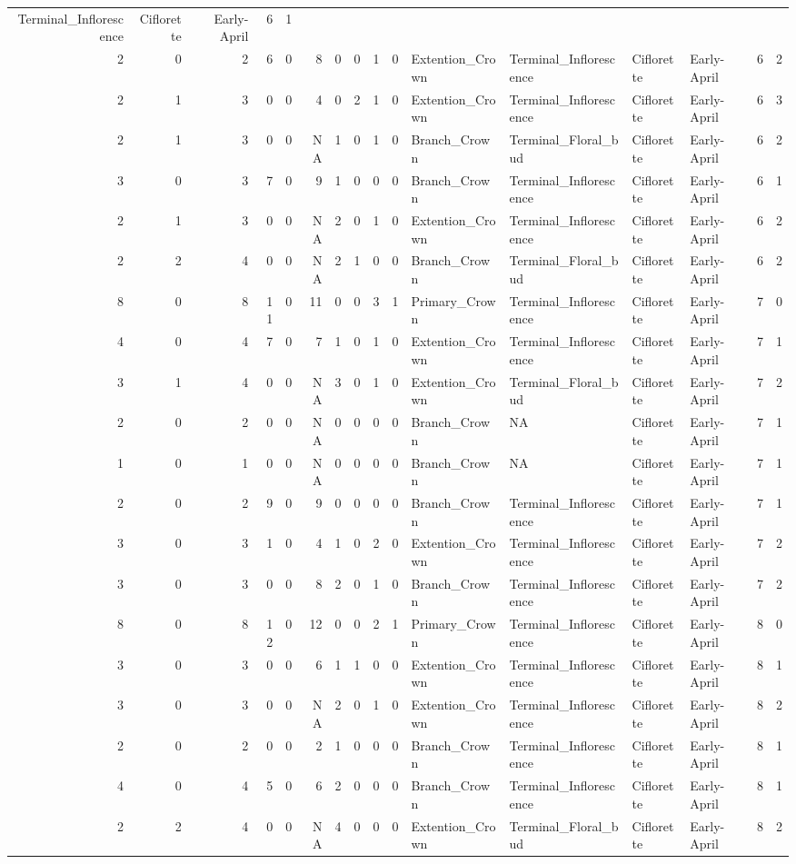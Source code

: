 \documentclass[]{article}
\begin{document}
\begin{longtable}[]{@{}rrrrrrrrrrllllrl@{}}
Terminal\_Inflorescence & Ciflorette & Early-April & 6 &
1\tabularnewline
2 & 0 & 2 & 6 & 0 & 8 & 0 & 0 & 1 & 0 & Extention\_Crown &
Terminal\_Inflorescence & Ciflorette & Early-April & 6 &
2\tabularnewline
2 & 1 & 3 & 0 & 0 & 4 & 0 & 2 & 1 & 0 & Extention\_Crown &
Terminal\_Inflorescence & Ciflorette & Early-April & 6 &
3\tabularnewline
2 & 1 & 3 & 0 & 0 & NA & 1 & 0 & 1 & 0 & Branch\_Crown &
Terminal\_Floral\_bud & Ciflorette & Early-April & 6 & 2\tabularnewline
3 & 0 & 3 & 7 & 0 & 9 & 1 & 0 & 0 & 0 & Branch\_Crown &
Terminal\_Inflorescence & Ciflorette & Early-April & 6 &
1\tabularnewline
2 & 1 & 3 & 0 & 0 & NA & 2 & 0 & 1 & 0 & Extention\_Crown &
Terminal\_Inflorescence & Ciflorette & Early-April & 6 &
2\tabularnewline
2 & 2 & 4 & 0 & 0 & NA & 2 & 1 & 0 & 0 & Branch\_Crown &
Terminal\_Floral\_bud & Ciflorette & Early-April & 6 & 2\tabularnewline
8 & 0 & 8 & 11 & 0 & 11 & 0 & 0 & 3 & 1 & Primary\_Crown &
Terminal\_Inflorescence & Ciflorette & Early-April & 7 &
0\tabularnewline
4 & 0 & 4 & 7 & 0 & 7 & 1 & 0 & 1 & 0 & Extention\_Crown &
Terminal\_Inflorescence & Ciflorette & Early-April & 7 &
1\tabularnewline
3 & 1 & 4 & 0 & 0 & NA & 3 & 0 & 1 & 0 & Extention\_Crown &
Terminal\_Floral\_bud & Ciflorette & Early-April & 7 & 2\tabularnewline
2 & 0 & 2 & 0 & 0 & NA & 0 & 0 & 0 & 0 & Branch\_Crown & NA & Ciflorette
& Early-April & 7 & 1\tabularnewline
1 & 0 & 1 & 0 & 0 & NA & 0 & 0 & 0 & 0 & Branch\_Crown & NA & Ciflorette
& Early-April & 7 & 1\tabularnewline
2 & 0 & 2 & 9 & 0 & 9 & 0 & 0 & 0 & 0 & Branch\_Crown &
Terminal\_Inflorescence & Ciflorette & Early-April & 7 &
1\tabularnewline
3 & 0 & 3 & 1 & 0 & 4 & 1 & 0 & 2 & 0 & Extention\_Crown &
Terminal\_Inflorescence & Ciflorette & Early-April & 7 &
2\tabularnewline
3 & 0 & 3 & 0 & 0 & 8 & 2 & 0 & 1 & 0 & Branch\_Crown &
Terminal\_Inflorescence & Ciflorette & Early-April & 7 &
2\tabularnewline
8 & 0 & 8 & 12 & 0 & 12 & 0 & 0 & 2 & 1 & Primary\_Crown &
Terminal\_Inflorescence & Ciflorette & Early-April & 8 &
0\tabularnewline
3 & 0 & 3 & 0 & 0 & 6 & 1 & 1 & 0 & 0 & Extention\_Crown &
Terminal\_Inflorescence & Ciflorette & Early-April & 8 &
1\tabularnewline
3 & 0 & 3 & 0 & 0 & NA & 2 & 0 & 1 & 0 & Extention\_Crown &
Terminal\_Inflorescence & Ciflorette & Early-April & 8 &
2\tabularnewline
2 & 0 & 2 & 0 & 0 & 2 & 1 & 0 & 0 & 0 & Branch\_Crown &
Terminal\_Inflorescence & Ciflorette & Early-April & 8 &
1\tabularnewline
4 & 0 & 4 & 5 & 0 & 6 & 2 & 0 & 0 & 0 & Branch\_Crown &
Terminal\_Inflorescence & Ciflorette & Early-April & 8 &
1\tabularnewline
2 & 2 & 4 & 0 & 0 & NA & 4 & 0 & 0 & 0 & Extention\_Crown &
Terminal\_Floral\_bud & Ciflorette & Early-April & 8 & 2\tabularnewline

\end{longtable}
\end{document}
